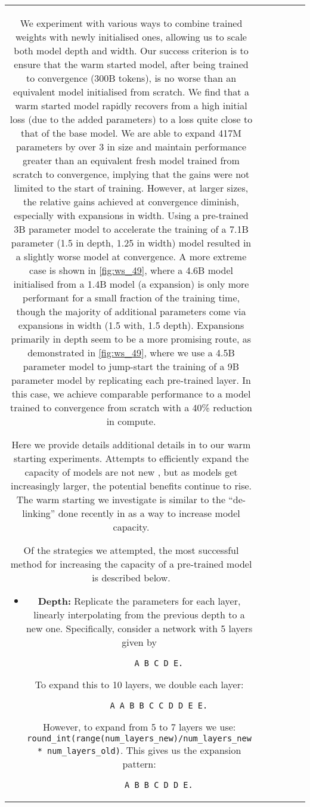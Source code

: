 \documentclass[11pt, a4paper, logo, internal, copyright, nonumbering]{deepmind}
\begin{document}
\begin{center}
\begin{longtable}{cclccc}
{We experiment with various ways to combine trained weights with newly initialised ones, allowing us to scale both model depth and width.
Our success criterion is to ensure that the warm started model, after being trained to convergence (300B tokens), is no worse than an equivalent model initialised from scratch.
We find that a warm started model rapidly recovers from a high initial loss (due to the added parameters) to a loss quite close to that of the base model.
We are able to expand 417M parameters by over 3 in size and maintain performance greater than an equivalent fresh model trained from scratch to convergence, implying that the gains were not limited to the start of training.
However, at larger sizes, the relative gains achieved at convergence diminish, especially with expansions in width.
Using a pre-trained 3B parameter model to accelerate the training of a 7.1B parameter (1.5 in depth, 1.25 in width) model resulted in a slightly worse model at convergence.
A more extreme case is shown in \autoref{fig:ws_49}, where a 4.6B model initialised from a 1.4B model (a  expansion) is only more performant for a small fraction of the training time, though the majority of additional parameters come via expansions in width (1.5 with, 1.5 depth).  
Expansions primarily in depth seem to be a more promising route, as demonstrated in \autoref{fig:ws_49}, where we use a 4.5B parameter model to jump-start the training of a 9B parameter model by replicating each pre-trained layer. In this case, we achieve comparable performance to a model trained to convergence from scratch with a 40\% reduction in compute.


Here we provide details additional details in to our warm starting experiments. 
Attempts to efficiently expand the capacity of models are not new \citep{chen2015net2net}, but as models get increasingly larger, the potential benefits continue to rise.
The warm starting we investigate is similar to the ``de-linking'' done recently in \citet{lin2021m610t} as a way to increase model capacity.

Of the strategies we attempted, the most successful method for increasing the capacity of a pre-trained model is described below. 
\begin{itemize}
    \item \textbf{Depth:} Replicate the parameters for each layer, linearly interpolating from the previous depth to a new one.
    Specifically, consider a network with 5 layers given by
    \begin{lstlisting}
        A B C D E.
    \end{lstlisting}
    To expand this to 10 layers, we double each layer:
    \begin{lstlisting}
        A A B B C C D D E E.
    \end{lstlisting}
    However, to expand from 5 to 7 layers we use:
    \newline
    \texttt{round\_int(range(num\_layers\_new)/num\_layers\_new * num\_layers\_old)}. This gives us the expansion pattern:
    \begin{lstlisting}
        A B B C D D E.
    \end{lstlisting} 


\end{itemize}}
\end{longtable}
\end{center}
\end{document}
